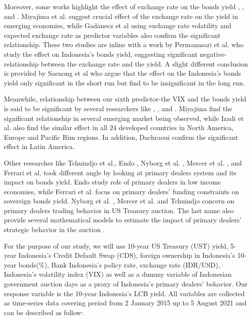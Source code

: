 \documentclass[11pt,a4paper,]{article}
\begin{document}
Moreover, some works highlight the effect of exchange rate on the bonds yield \autocite{Miyajima2015}, \autocite{Gadanecz2018}, \autocite{Saenong2020} and \autocite{Permanasari2021}. Miyajima et al. \autocite*{Miyajima2015} suggest crucial effect of the exchange rate on the yield in emerging economies, while Gadanecz et al \autocite{Gadanecz2018} using exchange rate volatility and expected exchange rate as predictor variables also confirm the significant relationship. These two studies are inline with a work by Permanasari et al. \autocite*{Permanasari2021} who study the effect on Indonesia's bonds yield, suggesting significant negative-relationship between the exchange rate and the yield. A slight different conclusion is provided by Saenong et al \autocite{Saenong2020} who argue that the effect on the Indonesia's bonds yield only significant in the short run but find to be insignificant in the long run.

Meanwhile, relationship between our sixth predictor-the VIX and the bonds yield is said to be significant by several researchers like \autocite{Miyajima2015}, \autocite{Izadi2018}, and \autocite{Dachraoui2020}. Miyajima find the significant relationship in several emerging market being observed, while Izadi et al. \autocite{Izadi2018} also find the similar effect in all 24 developed countries in
North America, Europe and Pacific Rim regions. In addition, Dachraoui \autocite*{Dachraoui2020} confirm the significant effect in Latin America.

Other researches like Tchuindjo et al.\autocite*{Tchuindjo2015}, Endo \autocite*{Endo2020}, Nyborg et al. \autocite*{Nyborg2004}, Mercer et al. \autocite*{Mercer2013}, and Ferrari et al. \autocite*{Ferrari2018} took different angle by looking at primary dealers system and its impact on bonds yield. Endo \autocite*{Endo2020} study role of primary dealers in low income economies, while Ferrari et al. \autocite*{Ferrari2018} focus on primary dealers' funding constraints on sovereign bonds yield. Nyborg et al. \autocite*{Nyborg2004}, Mercer et al. \autocite*{Mercer2013} and Tchuindjo \autocite*{Tchuindjo2015} concern on primary dealers trading behavior in US Treasury auction. The last name also provide several mathematical models to estimate the impact of primary dealers' strategic behavior in the auction \autocite*{Tchuindjo2015}.

For the purpose of our study, we will use 10-year US Treasury (UST) yield, 5-year Indonesia's Credit Default Swap (CDS), foreign ownership in Indonesia's 10-year bonds(\%), Bank Indonesia's policy rate, exchange rate (IDR/USD), Indonesia's volatility index (VIX) as well as a dummy variable of Indonesian government auction days as a proxy of Indonesia's primary dealers' behavior. Our response variable is the 10-year Indonesia's LCB yield. All variables are collected as time-series data covering period from 2 January 2015 up to 5 August 2021 and can be described as follow:
\end{document}

